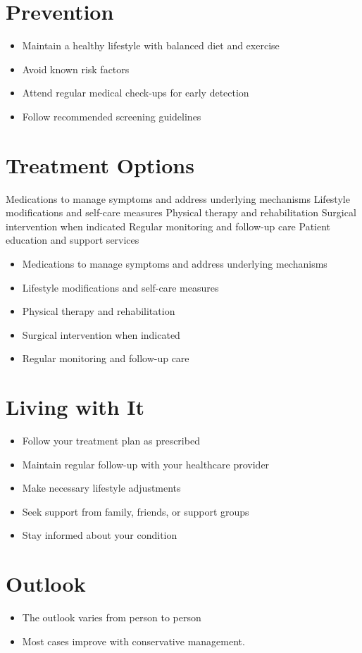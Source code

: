 \section{Prevention}
\begin{itemize}[noitemsep]
  \item Maintain a healthy lifestyle with balanced diet and exercise
  \item Avoid known risk factors
  \item Attend regular medical check-ups for early detection
  \item Follow recommended screening guidelines
\end{itemize}
\section{Treatment Options}
Medications to manage symptoms and address underlying mechanisms Lifestyle modifications and self-care measures Physical therapy and rehabilitation Surgical intervention when indicated Regular monitoring and follow-up care Patient education and support services

\begin{itemize}[noitemsep]
  \item Medications to manage symptoms and address underlying mechanisms
  \item Lifestyle modifications and self-care measures
  \item Physical therapy and rehabilitation
  \item Surgical intervention when indicated
  \item Regular monitoring and follow-up care
\end{itemize}
\section{Living with It}
\begin{itemize}[noitemsep]
  \item Follow your treatment plan as prescribed
  \item Maintain regular follow-up with your healthcare provider
  \item Make necessary lifestyle adjustments
  \item Seek support from family, friends, or support groups
  \item Stay informed about your condition
\end{itemize}
\section{Outlook}
\begin{itemize}[noitemsep]
  \item The outlook varies from person to person
  \item Most cases improve with conservative management.
\end{itemize}
